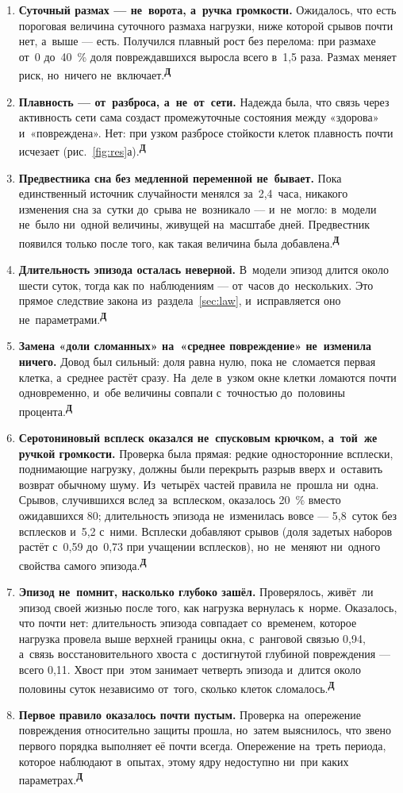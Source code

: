 \documentclass[11pt,a4paper,landscape,twocolumn]{article}
\newcommand{\tD}{\textsuperscript{\sffamily\bfseries\color{cO}Д}}
\begin{document}
\begin{enumerate}
\item \textbf{Суточный размах — не~ворота, а~ручка громкости.} Ожидалось, что есть пороговая величина суточного размаха нагрузки, ниже которой срывов почти нет, а~выше — есть. Получился плавный рост без перелома: при размахе от~0 до~40~\% доля повреждавшихся выросла всего в~1,5 раза. Размах меняет риск, но~ничего не~включает.\tD
\item \textbf{Плавность — от~разброса, а~не~от~сети.} Надежда была, что связь через активность сети сама создаст промежуточные состояния между «здорова» и~«повреждена». Нет: при узком разбросе стойкости клеток плавность почти исчезает (рис.~\ref{fig:res}а).\tD
\item \textbf{Предвестника сна без медленной переменной не~бывает.} Пока единственный источник случайности менялся за~2,4~часа, никакого изменения сна за~сутки до~срыва не~возникало — и~не~могло: в~модели не~было ни~одной величины, живущей на~масштабе дней. Предвестник появился только после того, как такая величина была добавлена.\tD
\item \textbf{Длительность эпизода осталась неверной.} В~модели эпизод длится около шести суток, тогда как по~наблюдениям — от~часов до~нескольких. Это прямое следствие закона из~раздела~\ref{sec:law}, и~исправляется оно не~параметрами.\tD
\item \textbf{Замена «доли сломанных» на~«среднее повреждение» не~изменила ничего.} Довод был сильный: доля равна нулю, пока не~сломается первая клетка, а~среднее растёт сразу. На~деле в~узком окне клетки ломаются почти одновременно, и~обе величины совпали с~точностью до~половины процента.\tD
\item \textbf{Серотониновый всплеск оказался не~спусковым крючком, а~той~же ручкой громкости.} Проверка была прямая: редкие односторонние всплески, поднимающие нагрузку, должны были перекрыть разрыв вверх и~оставить возврат обычному шуму. Из~четырёх частей правила не~прошла ни~одна. Срывов, случившихся вслед за~всплеском, оказалось 20~\% вместо ожидавшихся 80; длительность эпизода не~изменилась вовсе — 5,8~суток без всплесков и~5,2 с~ними. Всплески добавляют срывов (доля задетых наборов растёт с~0,59 до~0,73 при учащении всплесков), но~не~меняют ни~одного свойства самого эпизода.\tD
\item \textbf{Эпизод не~помнит, насколько глубоко зашёл.} Проверялось, живёт~ли эпизод своей жизнью после того, как нагрузка вернулась к~норме. Оказалось, что почти нет: длительность эпизода совпадает со~временем, которое нагрузка провела выше верхней границы окна, с~ранговой связью 0,94, а~связь восстановительного хвоста с~достигнутой глубиной повреждения — всего 0,11. Хвост при~этом занимает четверть эпизода и~длится около половины суток независимо от~того, сколько клеток сломалось.\tD
\item \textbf{Первое правило оказалось почти пустым.} Проверка на~опережение повреждения относительно защиты прошла, но~затем выяснилось, что звено первого порядка выполняет её почти всегда. Опережение на~треть периода, которое наблюдают в~опытах, этому ядру недоступно ни~при каких параметрах.\tD
\end{enumerate}
\end{document}
